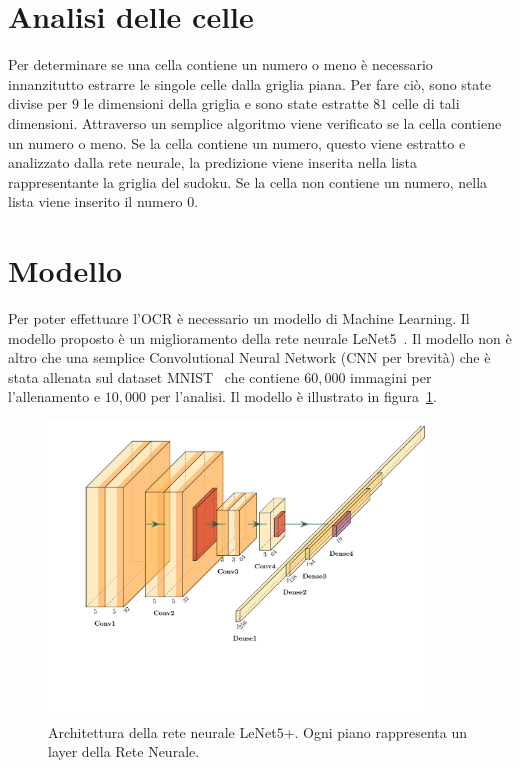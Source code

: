 \documentclass[a4paper, 10pt]{article}
\newcommand{\lenet}{LeNet\(5\)+}
\begin{document}
\section{Analisi delle celle}

Per determinare se una cella contiene un numero o meno è necessario innanzitutto
estrarre le singole celle dalla griglia piana. Per fare ciò, sono state divise
per \(9\) le dimensioni della griglia e sono state estratte \(81\) celle di tali
dimensioni. Attraverso un semplice algoritmo viene verificato se la cella
contiene un numero o meno. Se la cella contiene un numero, questo viene
estratto e analizzato dalla rete neurale, la predizione viene inserita nella
lista rappresentante la griglia del sudoku. Se la cella non contiene un numero,
nella lista viene inserito il numero \(0\).


\section{Modello}

Per poter effettuare l'OCR è necessario un modello di Machine Learning. Il
modello proposto è un miglioramento della rete neurale
LeNet5~\cite{lecun1998gradient}. Il modello non è altro che una semplice
Convolutional Neural Network (CNN per brevità) che è stata allenata sul dataset
MNIST~\cite{deng2012mnist} che contiene \(60,000\) immagini per l'allenamento e
\(10,000\) per l'analisi. Il modello è illustrato in
figura~\ref{fig:architecture}. \\

\begin{figure}[h]
    \includegraphics[width=0.9\textwidth, trim = 1cm 4.5cm 0cm 1cm]{architecture.pdf}
    \caption{Architettura della rete neurale \lenet. Ogni piano rappresenta un
    layer della Rete Neurale.}\label{fig:architecture}
\end{figure}
\end{document}
